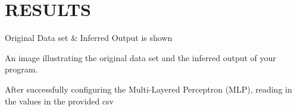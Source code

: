\documentclass[a4paper, 10pt]{IEEEconf}
\begin{document}
%
%
%
%


\section{RESULTS}

Original Data set \& Inferred Output is shown 

An image illustrating the original data set and the inferred output of your program.

After successfully configuring the Multi-Layered Perceptron (MLP), reading in the values in the provided csv
\end{document}
